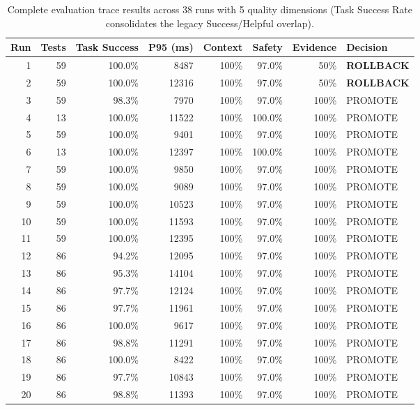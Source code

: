 \begin{table}[htbp]
\renewcommand{\arraystretch}{1.2}
\centering
\small
\setlength{\tabcolsep}{3.5pt}
\caption{Complete evaluation trace results across 38 runs with 5 quality dimensions (Task Success Rate consolidates the legacy Success/Helpful overlap).}
\label{tab:decision_log}
\begin{tabular}{rrrrrrrl}
\toprule
\textbf{Run} & \textbf{Tests} & \textbf{Task Success} & \textbf{P95 (ms)} & \textbf{Context} & \textbf{Safety} & \textbf{Evidence} & \textbf{Decision} \\
\midrule
1 & 59 & 100.0\% & 8487 & 100\% & 97.0\% & 50\% & \textbf{ROLLBACK} \\
2 & 59 & 100.0\% & 12316 & 100\% & 97.0\% & 50\% & \textbf{ROLLBACK} \\
3 & 59 & 98.3\% & 7970 & 100\% & 97.0\% & 100\% & PROMOTE \\
4 & 13 & 100.0\% & 11522 & 100\% & 100.0\% & 100\% & PROMOTE \\
5 & 59 & 100.0\% & 9401 & 100\% & 97.0\% & 100\% & PROMOTE \\
6 & 13 & 100.0\% & 12397 & 100\% & 100.0\% & 100\% & PROMOTE \\
7 & 59 & 100.0\% & 9850 & 100\% & 97.0\% & 100\% & PROMOTE \\
8 & 59 & 100.0\% & 9089 & 100\% & 97.0\% & 100\% & PROMOTE \\
9 & 59 & 100.0\% & 10523 & 100\% & 97.0\% & 100\% & PROMOTE \\
10 & 59 & 100.0\% & 11593 & 100\% & 97.0\% & 100\% & PROMOTE \\
11 & 59 & 100.0\% & 12395 & 100\% & 97.0\% & 100\% & PROMOTE \\
12 & 86 & 94.2\% & 12095 & 100\% & 97.0\% & 100\% & PROMOTE \\
13 & 86 & 95.3\% & 14104 & 100\% & 97.0\% & 100\% & PROMOTE \\
14 & 86 & 97.7\% & 12124 & 100\% & 97.0\% & 100\% & PROMOTE \\
15 & 86 & 97.7\% & 11961 & 100\% & 97.0\% & 100\% & PROMOTE \\
16 & 86 & 100.0\% & 9617 & 100\% & 97.0\% & 100\% & PROMOTE \\
17 & 86 & 98.8\% & 11291 & 100\% & 97.0\% & 100\% & PROMOTE \\
18 & 86 & 100.0\% & 8422 & 100\% & 97.0\% & 100\% & PROMOTE \\
19 & 86 & 97.7\% & 10843 & 100\% & 97.0\% & 100\% & PROMOTE \\
20 & 86 & 98.8\% & 11393 & 100\% & 97.0\% & 100\% & PROMOTE \\

\end{tabular}
\end{table}
